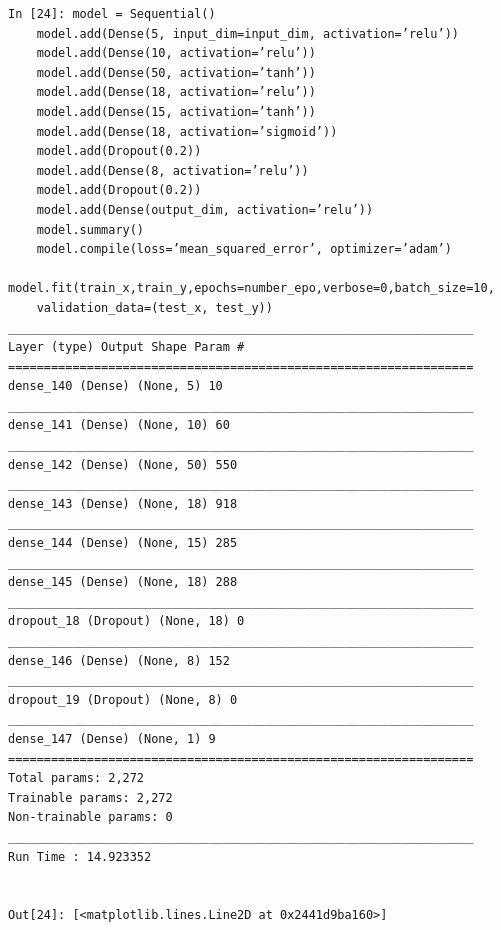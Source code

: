 \documentclass[10pt]{article}
\begin{document}
\begin{verbatim}
In [24]: model = Sequential()
    model.add(Dense(5, input_dim=input_dim, activation=’relu’))
    model.add(Dense(10, activation=’relu’))
    model.add(Dense(50, activation=’tanh’))
    model.add(Dense(18, activation=’relu’))
    model.add(Dense(15, activation=’tanh’))
    model.add(Dense(18, activation=’sigmoid’))
    model.add(Dropout(0.2))
    model.add(Dense(8, activation=’relu’))
    model.add(Dropout(0.2))
    model.add(Dense(output_dim, activation=’relu’))
    model.summary()
    model.compile(loss=’mean_squared_error’, optimizer=’adam’)
    model.fit(train_x,train_y,epochs=number_epo,verbose=0,batch_size=10,
    validation_data=(test_x, test_y))
_________________________________________________________________
Layer (type) Output Shape Param #
=================================================================
dense_140 (Dense) (None, 5) 10
_________________________________________________________________
dense_141 (Dense) (None, 10) 60
_________________________________________________________________
dense_142 (Dense) (None, 50) 550
_________________________________________________________________
dense_143 (Dense) (None, 18) 918
_________________________________________________________________
dense_144 (Dense) (None, 15) 285
_________________________________________________________________
dense_145 (Dense) (None, 18) 288
_________________________________________________________________
dropout_18 (Dropout) (None, 18) 0
_________________________________________________________________
dense_146 (Dense) (None, 8) 152
_________________________________________________________________
dropout_19 (Dropout) (None, 8) 0
_________________________________________________________________
dense_147 (Dense) (None, 1) 9
=================================================================
Total params: 2,272
Trainable params: 2,272
Non-trainable params: 0
_________________________________________________________________
Run Time : 14.923352


Out[24]: [<matplotlib.lines.Line2D at 0x2441d9ba160>]


\end{verbatim}
\end{document}

